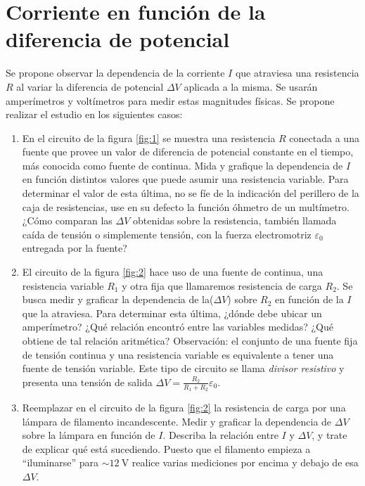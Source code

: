 \documentclass[laboratorio]{guia}
\begin{document}
 
\maketitle

\section{Corriente en función de la diferencia de potencial}
Se propone observar la dependencia de la corriente \(I\) que atraviesa una
resistencia \(R\) al variar la diferencia de potencial \(\Delta V\) aplicada a la misma.
Se usarán amperímetros y voltímetros para medir estas magnitudes físicas.
Se propone realizar el estudio en los siguientes casos:
\begin{enumerate}
\item En el circuito de la figura \ref{fig:1} se muestra una resistencia \(R\) conectada a una fuente que provee un valor de diferencia de potencial constante en el tiempo, más conocida como fuente de continua.
Mida y grafique la dependencia de \(I\) en función distintos valores que puede asumir una resistencia variable.
Para determinar el valor de esta última, no se fíe de la indicación del perillero de la caja de resistencias, use en su defecto la función óhmetro de un multímetro.
¿Cómo comparan las \(\Delta V\) obtenidas sobre la resistencia, también llamada caída de tensión o simplemente tensión, con la fuerza electromotriz \(\varepsilon_0\) entregada por la fuente?

\item El circuito de la figura \ref{fig:2} hace uso de una fuente de continua, una resistencia variable \(R_1\) y otra fija que llamaremos resistencia de carga \(R_2\).
Se busca medir y graficar la dependencia de la(\(\Delta V\)) sobre \(R_2\) en función de la \(I\) que la atraviesa.
Para determinar esta última, ¿dónde debe ubicar un amperímetro?
¿Qué relación encontró entre las variables medidas?
¿Qué obtiene de tal relación aritmética?
Observación: el conjunto de una fuente fija de tensión continua y una resistencia variable es equivalente a tener una fuente de tensión variable.
Este tipo de circuito se llama \emph{divisor resistivo} y presenta una tensión de salida \(\Delta V= \frac{R_2}{R_1+ R_2} \varepsilon_0\).

\item Reemplazar en el circuito de la figura \ref{fig:2} la resistencia de carga por una lámpara de filamento incandescente.
Medir y graficar la dependencia de \(\Delta V\) sobre la lámpara en función de \(I\).
Describa la relación entre \(I\) y \(\Delta V\), y trate de explicar qué está sucediendo.
Puesto que el filamento empieza a ``iluminarse'' para \(\sim \SI{12}{\volt}\) realice varias mediciones por encima y debajo de esa \(\Delta V\).
\end{enumerate}
\end{document}
